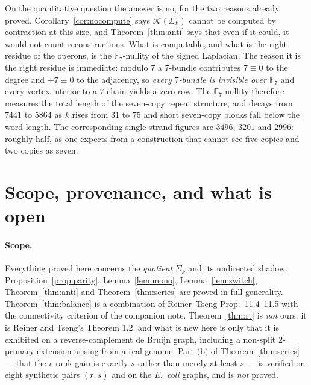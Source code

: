 \documentclass[11pt]{article}
\theoremstyle{plain}
\theoremstyle{definition}
\theoremstyle{remark}
\newcommand{\K}{\mathcal{K}}
\newcommand{\Sig}{\Sigma}
\begin{document}
On the quantitative question the answer is no, for the two reasons already proved.
Corollary~\ref{cor:nocompute} says $\K(\Sig_k)$ cannot be computed by contraction at this
size, and Theorem~\ref{thm:anti} says that even if it could, it would not count
reconstructions. What is computable, and what is the right residue of the operons, is the
$\mathbb{F}_7$-nullity of the signed Laplacian. The reason it is the right residue is
immediate: modulo $7$ a $7$-bundle contributes $7\equiv0$ to the degree and $\pm7\equiv0$ to
the adjacency, so \emph{every $7$-bundle is invisible over $\mathbb{F}_7$} and every vertex
interior to a $7$-chain yields a zero row. The $\mathbb{F}_7$-nullity therefore measures the
total length of the seven-copy repeat structure, and decays from $7441$ to $5864$ as $k$
rises from $31$ to $75$ and short seven-copy blocks fall below the word length. The
corresponding single-strand figures are $3496$, $3201$ and $2996$: roughly half, as one
expects from a construction that cannot see five copies and two copies as seven.

\section{Scope, provenance, and what is open}

\paragraph{Scope.} Everything proved here concerns the \emph{quotient} $\Sig_k$ and its
undirected shadow. Proposition~\ref{prop:parity}, Lemma~\ref{lem:mono},
Lemma~\ref{lem:switch}, Theorem~\ref{thm:anti} and Theorem~\ref{thm:series} are proved in
full generality. Theorem~\ref{thm:balance} is a combination of Reiner--Tseng
Prop.~11.4--11.5 with the connectivity criterion of the companion note. Theorem~\ref{thm:rt}
is \emph{not} ours: it is Reiner and Tseng's Theorem 1.2, and what is new here is only that
it is exhibited on a reverse-complement de Bruijn graph, including a non-split $2$-primary
extension arising from a real genome. Part (b) of Theorem~\ref{thm:series} --- that the
$r$-rank gain is exactly $s$ rather than merely at least $s$ --- is verified on eight
synthetic pairs $(r,s)$ and on the \emph{E.\ coli} graphs, and is \emph{not} proved.
\end{document}
